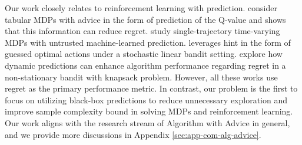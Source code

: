 \documentclass[12pt]{article}
\begin{document}

Our work closely relates to reinforcement learning with prediction. \cite{golowich2022can} consider tabular MDPs with advice in the form of prediction of the Q-value and shows that this information can reduce regret. \cite{li2024beyond} study single-trajectory time-varying MDPs with untrusted machine-learned prediction. \cite{cutkosky2022leveraging} leverages hint in the form of guessed optimal actions under a stochastic linear bandit setting. \cite{lyu2023bandits} explore how dynamic predictions can enhance algorithm performance regarding regret in a non-stationary bandit with knapsack problem. However, all these works use regret as the primary performance metric. In contrast, our problem is the first to focus on utilizing black-box predictions to reduce unnecessary exploration and improve sample complexity bound in solving MDPs and reinforcement learning. Our work aligns with the research stream of Algorithm with Advice \cite{mitzenmacher2022algorithms} in general, and we provide more discussions in Appendix \ref{sec:app-com-alg-advice}.



\end{document}
